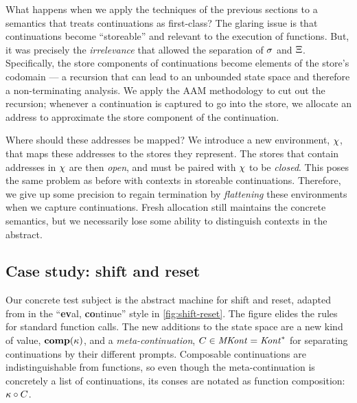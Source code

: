 What happens when we apply the techniques of the previous sections to a semantics that treats continuations as first-class?
%
The glaring issue is that continuations become ``storeable'' and relevant to the execution of functions.
%
But, it was precisely the \emph{irrelevance} that allowed the separation of $\sigma$ and $\Xi$.
%
Specifically, the store components of continuations become elements of the store's codomain --- a recursion that can lead to an unbounded state space and therefore a non-terminating analysis.
%
We apply the AAM methodology to cut out the recursion; whenever a continuation is captured to go into the store, we allocate an address to approximate the store component of the continuation.

Where should these addresses be mapped?
%
We introduce a new environment, $\chi$, that maps these addresses to the stores they represent.
%
The stores that contain addresses in $\chi$ are then \emph{open}, and must be paired with $\chi$ to be \emph{closed}.
%
This poses the same problem as before with contexts in storeable continuations.
%
Therefore, we give up some precision to regain termination by \emph{flattening} these environments when we capture continuations.
%
Fresh allocation still maintains the concrete semantics, but we necessarily lose some ability to distinguish contexts in the abstract.

\subsection{Case study: shift and reset}
Our concrete test subject is the abstract machine for shift and reset, adapted from \citet{ianjohnson:Biernacki2006274} in the ``{\bf ev}al, {\bf co}ntinue'' style in \autoref{fig:shift-reset}.
%
The figure elides the rules for standard function calls.
%
The new additions to the state space are a new kind of value, $\mathbf{comp}(\kappa)$, and a \emph{meta-continuation}, $C \in \mathit{MKont} = \mathit{Kont}^*$ for separating continuations by their different prompts.
%
Composable continuations are indistinguishable from functions, so even though the meta-continuation is concretely a list of continuations, its conses are notated as function composition: $\kappa\circ C$.

